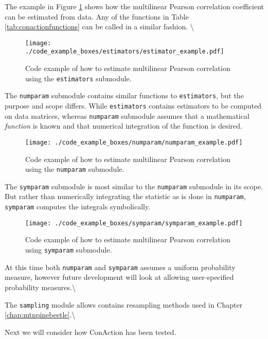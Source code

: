 \documentclass[
  letterpaper,
  DIV=11,
  numbers=noendperiod]{scrreprt}
\begin{document}
The example in Figure \ref{code:estimatorexample} shows how the
multilinear Pearson correlation coefficient can be estimated from data.
Any of the functions in Table \ref{tab:conactionfunctions} can be called
in a similar fashion. \textbackslash{}

\begin{figure}[H]
\tiny
\centering
\texttt{[image: ./code\_example\_boxes/estimators/estimator\_example.pdf]}
\caption{Code example of how to estimate multilinear Pearson correlation using the \texttt{estimators} submodule.}
\label{code:estimatorexample}
\end{figure}

The \texttt{numparam} submodule contains similar functions to
\texttt{estimators}, but the purpose and scope differs. While
\texttt{estimators} contains estimators to be computed on data matrices,
whereas \texttt{numparam} submodule assumes that a mathematical
\emph{function} is known and that numerical integration of the function
is desired.

\begin{figure}[H]
\tiny
\centering
\texttt{[image: ./code\_example\_boxes/numparam/numparam\_example.pdf]}
\caption{Code example of how to estimate multilinear Pearson correlation using the \texttt{numparam} submodule.}
\label{code:numparamexample}
\end{figure}

The \texttt{symparam} submodule is most similar to the \texttt{numparam}
submodule in its scope. But rather than numerically integrating the
statistic as is done in \texttt{numparam}, \texttt{symparam} computes
the integrals symbolically.

\begin{figure}[H]
\tiny
\centering
\texttt{[image: ./code\_example\_boxes/symparam/symparam\_example.pdf]}
\caption{Code example of how to estimate multilinear Pearson correlation using \texttt{symparam} submodule.}
\label{code:numparamexample}
\end{figure}

At this time both \texttt{numparam} and \texttt{symparam} assumes a
uniform probability measure, however future development will look at
allowing user-specified probability measures.\textbackslash{}

The \texttt{sampling} module allows contains resampling methods used in
Chapter \ref{chap:mtnpinebeetle}.\textbackslash{}

Next we will consider how ConAction has been tested.
\end{document}
